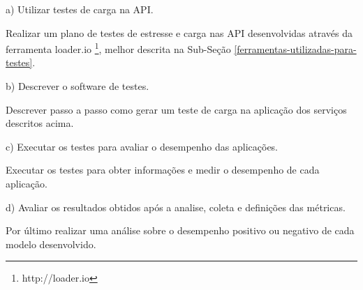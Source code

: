   \begin{compactitem}
    \item[a)] Utilizar testes de carga na \ac{API}.
    
    Realizar um plano de testes de estresse e carga nas \ac{API} desenvolvidas através
    da ferramenta loader.io \footnote{\label{noteloader}http://loader.io}, melhor descrita na Sub-Seção \ref{ferramentas-utilizadas-para-testes}.
    
    
    \item[b)] Descrever o software de testes.
    
    Descrever passo a passo como gerar um teste de carga na aplicação dos serviços descritos acima.
    
    \item[c)] Executar os testes para avaliar o desempenho das aplicações.
    
    Executar os testes para obter informações e medir o desempenho de cada aplicação.
    
    \item[d)] Avaliar os resultados obtidos após a analise, coleta e definições das métricas.
    
    Por último realizar uma análise sobre o desempenho positivo ou negativo de cada modelo desenvolvido.
    
    
  \end{compactitem}





